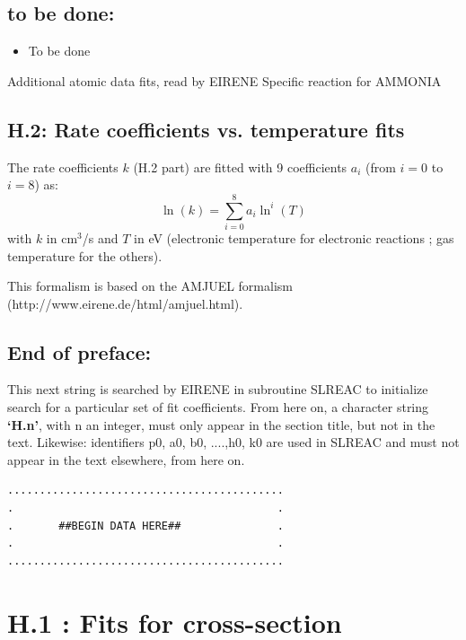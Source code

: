 \documentclass[12pt,dvipdfm]{article}
\begin{document}
\subsection*{to be done:}
\begin{itemize}
\item  To be done
\end{itemize}


Additional atomic data fits, read by EIRENE
Specific reaction for AMMONIA

\subsection*{H.2: Rate coefficients vs. temperature fits}
The rate coefficients $k$ (H.2 part) are fitted with 9 coefficients $a_i$ (from $i=0$ to $i=8$) as:
\begin{equation}
\ln(k) = \sum_{i=0}^8  a_i \ln^i(T)
\end{equation}
with $k$ in cm$^3$/s and $T$ in eV (electronic temperature for electronic reactions ; gas temperature for the others).

This formalism is based on the AMJUEL formalism (http://www.eirene.de/html/amjuel.html).

\subsection*{End of preface:}
This next string is searched by EIRENE in subroutine SLREAC
to initialize search for a particular set of fit coefficients.
From here on, a character string \textbf{`H.n'}, with n an integer, must only appear in the
section title,
but not in the text. Likewise: identifiers p0, a0, b0, ....,h0, k0 are used
in SLREAC and must not
appear in the text elsewhere, from here on.

\bigskip
\begin{small}\begin{verbatim}
...........................................
.                                         .
.       ##BEGIN DATA HERE##               .
.                                         .
...........................................
\end{verbatim}\end{small}
\newpage

\setcounter{section}{0}

\section{H.1 : Fits for cross-section }
\end{document}
